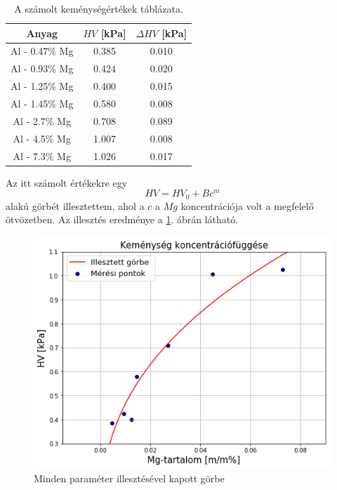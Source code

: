 \documentclass[12pt,a4paper]{article}
\begin{document}
\begin{table}[!h]
\begin{center}
\begin{tabular}{|c|c|c|}
\hline
Anyag & $HV$ [kPa] & $\Delta HV$ [kPa]\\
\hline
Al - 0.47$\%$ Mg & 0.385 & 0.010\\ 
\hline
Al - 0.93$\%$ Mg & 0.424  & 0.020\\
\hline
Al - 1.25$\%$ Mg & 0.400 & 0.015\\ 
\hline
Al - 1.45$\%$ Mg & 0.580 & 0.008\\
\hline
Al - 2.7$\%$ Mg & 0.708 & 0.089 \\
\hline
Al - 4.5$\%$ Mg & 1.007 & 0.008\\
\hline
Al - 7.3$\%$ Mg & 1.026 & 0.017\\
\hline
\end{tabular}
\caption{A számolt keménységértékek táblázata.}
\label{tab:kemeny}
\end{center}
\end{table}
Az itt számolt értékekre egy 
\begin{equation}
HV=HV_0 + Bc^m
\label{eq:kemeny}
\end{equation}
alakú görbét illesztettem, ahol a $c$ a $Mg$ koncentrációja volt a megfelelő ötvözetben. Az illesztés eredménye a \ref{fig:fit1}. ábrán látható.\\
\begin{figure}[!h]
\centering
\includegraphics[scale=0.65]{szabad}
\caption{Minden paraméter illesztésével kapott görbe}
\label{fig:fit1}
\end{figure}
\end{document}
